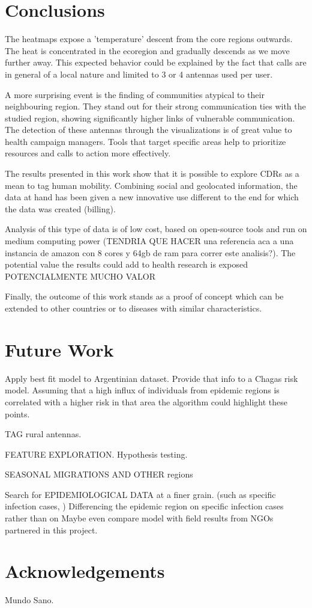 \section{Conclusions}

The heatmaps expose a 'temperature' descent from the core regions outwards. The heat is concentrated in the ecoregion and gradually descends as we move further away. This expected behavior could be explained by the fact that calls are in general of a local nature and limited to 3 or 4 antennas used per user. 

A more surprising event is the finding of communities atypical to their neighbouring region. They stand out for their strong communication ties with the studied region, showing significantly higher links of vulnerable communication. The detection of these antennas through the visualizations is of great value to health campaign managers. Tools that target specific areas help to prioritize resources and calls to action more effectively.

The results presented in this work show that it is possible to explore CDRs as a mean to tag human mobility. Combining social and geolocated information, the data at hand has been given a new innovative use different to the end for which the data was created (billing).

Analysis of this type of data is of low cost, based on open-source tools and run on medium computing power (TENDRIA QUE HACER una referencia aca a una instancia de amazon con 8 cores y 64gb de ram para correr este analisis?). The potential value the results could add to health research is exposed
 POTENCIALMENTE MUCHO VALOR

Finally, the outcome of this work stands as a proof of concept which can be extended to other countries or to diseases with similar characteristics.

\section{Future Work}
Apply best fit model to Argentinian dataset. Provide that info to a Chagas risk model. Assuming that a high influx of individuals from epidemic regions is correlated with a higher risk in that area the algorithm could highlight these points.

TAG rural antennas.

FEATURE EXPLORATION. Hypothesis testing. 

SEASONAL MIGRATIONS AND OTHER regions

Search for EPIDEMIOLOGICAL DATA at a finer grain. (such as specific infection cases, ) Differencing the epidemic region on specific infection cases rather than on
Maybe even compare model with field results from NGOs partnered in this project.

\section{Acknowledgements}
Mundo Sano.
